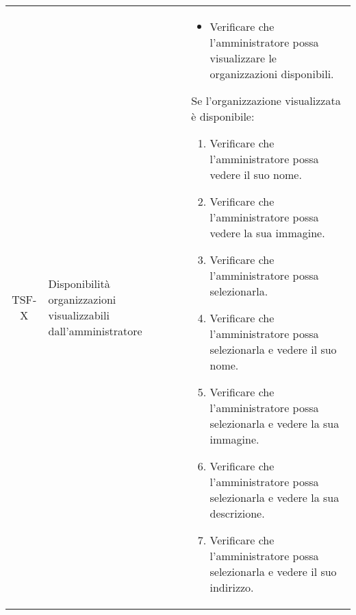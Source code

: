 {\begin{longtable}{ c | C{3cm} | C{11cm} }
TSF-X & Disponibilità organizzazioni visualizzabili dall'amministratore & \begin{itemize}
    \item Verificare che l'amministratore possa visualizzare le organizzazioni disponibili.
\end{itemize}
Se l'organizzazione visualizzata è disponibile:
\begin{enumerate}
    \item Verificare che l'amministratore possa vedere il suo nome.
    \item Verificare che l'amministratore possa vedere la sua immagine.
    \item Verificare che l'amministratore possa selezionarla.
    \item Verificare che l'amministratore possa selezionarla e vedere il suo nome.
    \item Verificare che l'amministratore possa selezionarla e vedere la sua immagine.
    \item Verificare che l'amministratore possa selezionarla e vedere la sua descrizione.
    \item Verificare che l'amministratore possa selezionarla e vedere il suo indirizzo.
\end{enumerate} \\


\end{longtable}}
